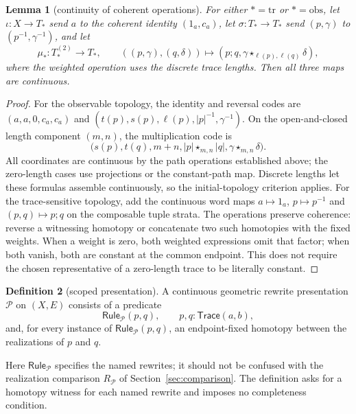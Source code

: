 \documentclass[10pt,reqno]{amsart}
\theoremstyle{definition}
\newtheorem{definition}{Definition}[section]
\theoremstyle{plain}
\newtheorem{lemma}[definition]{Lemma}
\theoremstyle{remark}
\newcommand{\Trace}{\mathsf{Trace}}
\begin{document}
\begin{lemma}[continuity of coherent operations]\label{lem:coherent-operations-continuous}
For either $*=\mathrm{tr}$ or $*=\mathrm{obs}$, let $\iota:X\to T_*$ send
$a$ to the coherent identity $(1_a,c_a)$, let $\sigma:T_*\to T_*$ send
$(p,\gamma)$ to
$(p^{-1},\gamma^{-1})$, and let
\[
  \mu_*:T_*^{(2)}\longrightarrow T_*,
  \qquad ((p,\gamma),(q,\delta))\longmapsto
    (p;q,\gamma\star_{\ell(p),\ell(q)}\delta),
\]
where the weighted operation uses the discrete trace lengths.  Then all three
maps are continuous.
\end{lemma}

\begin{proof}
For the observable topology, the identity and reversal codes are
$(a,a,0,c_a,c_a)$ and
$(t(p),s(p),\ell(p),|p|^{-1},\gamma^{-1})$.
On the open-and-closed length component $(m,n)$, the multiplication code is
\[
 \bigl(s(p),t(q),m+n,
       |p|\star_{m,n}|q|,\gamma\star_{m,n}\delta\bigr).
\]
All coordinates are continuous by the path operations established above;
the zero-length cases use projections or the constant-path map.
Discrete lengths let these formulas assemble continuously, so the
initial-topology criterion applies. For the trace-sensitive topology, add
the continuous word maps $a\mapsto1_a$, $p\mapsto p^{-1}$ and
$(p,q)\mapsto p;q$ on the composable tuple strata.
The operations preserve coherence: reverse a witnessing homotopy or
concatenate two such homotopies with the fixed weights. When a weight is
zero, both weighted expressions omit that factor; when both vanish, both
are constant at the common endpoint. This does not require the chosen
representative of a zero-length trace to be literally constant.
\end{proof}

\begin{definition}[scoped presentation]
A continuous geometric rewrite presentation $\mathcal P$ on $(X,E)$ consists
of a predicate
\[
  \mathsf{Rule}_{\mathcal P}(p,q),\qquad p,q:\Trace(a,b),
\]
and, for every instance of $\mathsf{Rule}_{\mathcal P}(p,q)$, an endpoint-fixed homotopy
between the realizations of $p$ and $q$.
\end{definition}

Here $\mathsf{Rule}_{\mathcal P}$ specifies the named rewrites; it should
not be confused with the realization comparison $R_{\mathcal P}$ of Section~\ref{sec:comparison}.
The definition asks for a homotopy witness for each named rewrite and imposes
no completeness condition.
\end{document}
